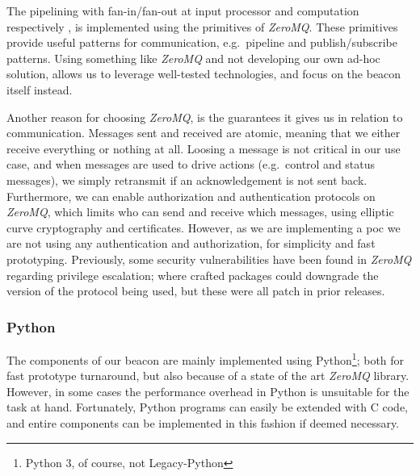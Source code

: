The pipelining with fan-in/fan-out at input processor and computation respectively , is implemented using the primitives of \textit{ZeroMQ}.
These primitives provide useful patterns for communication, e.g.\ pipeline and publish/subscribe patterns.
Using something like \textit{ZeroMQ} and not developing our own ad-hoc solution, allows us to leverage well-tested technologies, and focus on the beacon itself instead.

Another reason for choosing \textit{ZeroMQ}, is the guarantees it gives us in relation to communication.
Messages sent and received are atomic, meaning that we either receive everything or nothing at all.
Loosing a message is not critical in our use case, and when messages are used to drive actions (e.g.\ control and status messages), we simply retransmit if an acknowledgement is not sent back.
Furthermore, we can enable authorization and authentication protocols on \textit{ZeroMQ}, which limits who can send and receive which messages, using elliptic curve cryptography and certificates.
However, as we are implementing a \gls{poc} we are not using any authentication and authorization, for simplicity and fast prototyping.
Previously, some security vulnerabilities have been found in \textit{ZeroMQ} regarding privilege escalation; where crafted packages could downgrade the version of the protocol being used, but these were all patch in prior releases.


\subsubsection{Python}
The components of our beacon are mainly implemented using Python\footnote{Python 3, of course, not Legacy-Python}; both for fast prototype turnaround, but also because of a state of the art \textit{ZeroMQ} library.
However, in some cases the performance overhead in Python is unsuitable for the task at hand.
Fortunately, Python programs can easily be extended with C code, and entire components can be implemented in this fashion if deemed necessary.
